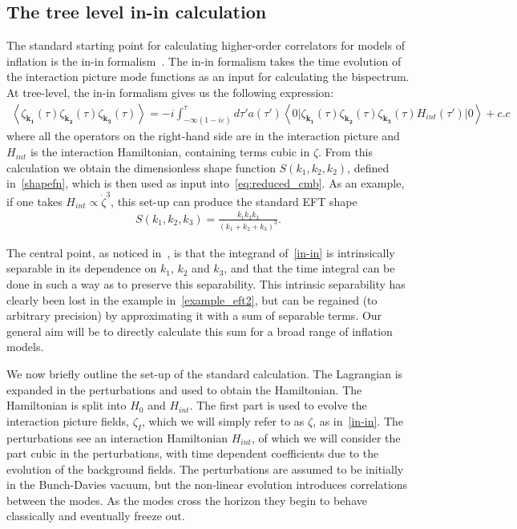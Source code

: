 \documentclass[a4paper,12pt]{extarticle}
\newcommand{\Hint}{H_{int}}
\begin{document}
\subsection{The tree level in-in calculation}\label{sec:rev_inin}
The standard starting point for calculating
higher-order correlators for models of inflation is the in-in formalism~\cite{Maldacena,weinberg_in_in}.
The in-in formalism takes the time evolution of the interaction picture mode
functions as an input for calculating the bispectrum.
At tree-level, the in-in formalism gives us the
following expression:
\begin{align}
{
    \left< \zeta_{\mathbf{k_1}}(\tau)\zeta_{\mathbf{k_2}}(\tau)\zeta_{\mathbf{k_3}}(\tau) \right>
=-i\int_{-\infty(1-i\varepsilon)}^{\tau}d\tau'a(\tau')
    \left<0\lvert \zeta_{\mathbf{k_1}}(\tau)\zeta_{\mathbf{k_2}}(\tau)\zeta_{\mathbf{k_3}}(\tau)\Hint(\tau') \rvert0\right>+c.c\label{in-in}
}
\end{align}
where all the operators on the right-hand side are in the interaction picture
and $\Hint$ is the interaction Hamiltonian, containing terms cubic in $\zeta$.
From this calculation we obtain the dimensionless shape function $S(k_1,k_2,k_2)$,
defined in~\eqref{shapefn},
which is then used as input into~\eqref{eq:reduced_cmb}.
As an example, if one takes $\Hint\propto\dot{\zeta}^3$, this set-up can produce the standard EFT shape
\begin{align}\label{example_eft2}
    S(k_1, k_2, k_3) = \frac{k_1k_2k_3}{(k_1+k_2+k_3)^3}.
\end{align}

The central point, as noticed in~\cite{Funakoshi}, is that the
integrand of~\eqref{in-in} is intrinsically separable
in its dependence on $k_1$, $k_2$ and $k_3$, and that the time integral
can be done in such a way as to preserve this separability.
This intrinsic separability has clearly been lost in
the example in~\eqref{example_eft2},
but can be regained (to arbitrary precision) by approximating it
with a sum of separable terms. Our general aim will be to directly calculate
this sum for a broad range of inflation models.

We now briefly outline the set-up of the standard calculation.
The Lagrangian is expanded in the perturbations and used to obtain the Hamiltonian.
The Hamiltonian is split into $H_0$ and $\Hint$.
The first part is used to evolve the interaction picture fields, $\zeta_I$,
which we will simply refer to as $\zeta$, as in~\eqref{in-in}.
The perturbations see an interaction Hamiltonian $\Hint$,
of which we will consider the part cubic in the perturbations,
with time dependent coefficients due to the evolution of the background fields.
The perturbations are assumed to be initially in the Bunch-Davies vacuum,
but the non-linear
evolution introduces correlations between the modes.
As the modes cross the horizon they begin to behave classically
and eventually freeze out.
\end{document}
